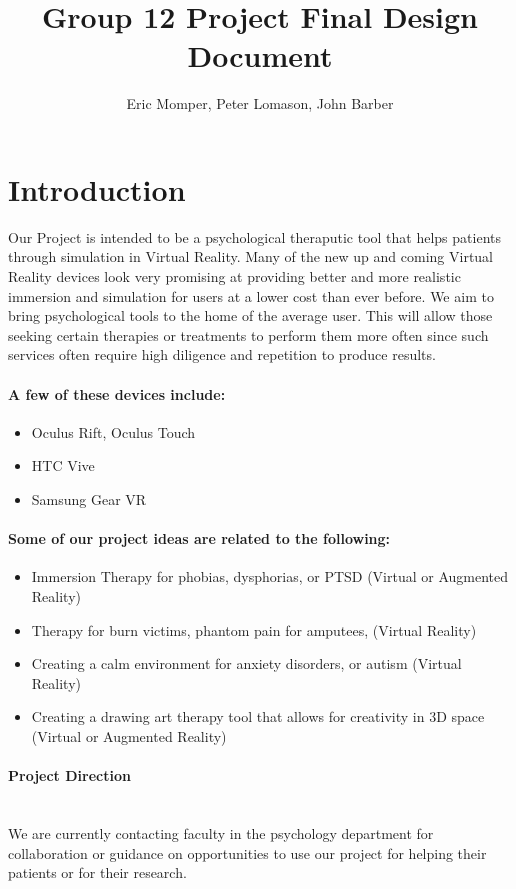 \documentclass[a4paper,10pt]{article}
\title{Group 12 Project Final Design Document}
\author{Eric Momper, Peter Lomason, John Barber}
\begin{document}
	
	\maketitle
	
	\pagebreak
	\tableofcontents
	\pagebreak
	
	\section{Introduction}
		Our Project is intended to be a psychological theraputic tool that helps patients through simulation in Virtual Reality.
	Many of the new up and coming Virtual Reality devices look very promising at providing better and more realistic immersion and simulation for users at a lower cost than ever before. We aim to bring psychological tools to the home of the average user. This will allow those seeking certain therapies or treatments to perform them more often since such services often require high diligence and repetition to produce results.
	
	\paragraph{A few of these devices include:}
	\begin{itemize}
		\item Oculus Rift, Oculus Touch
		\item HTC Vive
		\item Samsung Gear VR
	\end{itemize}
	
	\paragraph{ Some of our project ideas are related to the following:}
	\begin{itemize}
		\item ​Immersion Therapy for phobias, dysphorias, or PTSD (Virtual or Augmented Reality)
		\item Therapy for burn victims, phantom pain for amputees,  (Virtual Reality)
		\item Creating a calm environment for  anxiety disorders, or autism (Virtual Reality)
		\item Creating a drawing art therapy tool that allows for creativity in 3D space (Virtual or Augmented Reality)
	\end{itemize}
	
	
	\paragraph{Project Direction} ~\\ We are currently contacting faculty in the psychology department for collaboration or guidance on opportunities to use our project for helping their patients or for their research.
\end{document}
